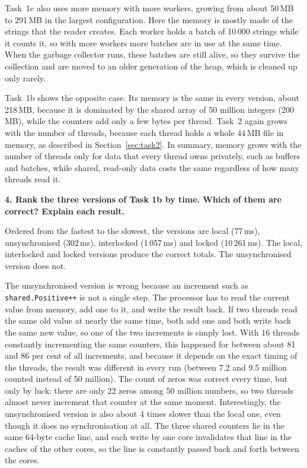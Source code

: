 \documentclass[11pt,a4paper]{article}
\newcommand{\question}[1]{\par\medskip\textbf{#1}\par}
\begin{document}
Task~1c also uses more memory with more workers, growing from about 50\,MB to 291\,MB in the largest
configuration. Here the memory is mostly made of the strings that the reader creates. Each worker
holds a batch of 10\,000 strings while it counts it, so with more workers more batches are in use at
the same time. When the garbage collector runs, these batches are still alive, so they survive the
collection and are moved to an older generation of the heap, which is cleaned up only rarely.

Task~1b shows the opposite case. Its memory is the same in every version, about 218\,MB, because it
is dominated by the shared array of 50 million integers (200\,MB), while the counters add only a few
bytes per thread. Task~2 again grows with the number of threads, because each thread holds a whole
44\,MB file in memory, as described in Section~\ref{sec:task2}. In summary, memory grows with the
number of threads only for data that every thread owns privately, such as buffers and batches, while
shared, read-only data costs the same regardless of how many threads read it.

\question{4. Rank the three versions of Task 1b by time. Which of them are correct? Explain each
result.}

Ordered from the fastest to the slowest, the versions are local (77\,ms), unsynchronised (302\,ms),
interlocked (1\,057\,ms) and locked (10\,261\,ms). The local, interlocked and locked versions produce
the correct totals. The unsynchronised version does not.

The unsynchronised version is wrong because an increment such as \texttt{shared.Positive++} is not a
single step. The processor has to read the current value from memory, add one to it, and write the
result back. If two threads read the same old value at nearly the same time, both add one and both
write back the same new value, so one of the two increments is simply lost. With 16 threads
constantly incrementing the same counters, this happened for between about 81 and 86 per cent of all
increments, and because it depends on the exact timing of the threads, the result was different in
every run (between 7.2 and 9.5 million counted instead of 50 million). The count of zeros was correct
every time, but only by luck: there are only 22 zeros among 50 million numbers, so two threads almost
never increment that counter at the same moment. Interestingly, the unsynchronised version is also
about 4 times slower than the local one, even though it does no synchronisation at all. The three
shared counters lie in the same 64-byte cache line, and each write by one core invalidates that line
in the caches of the other cores, so the line is constantly passed back and forth between the cores.
\end{document}
